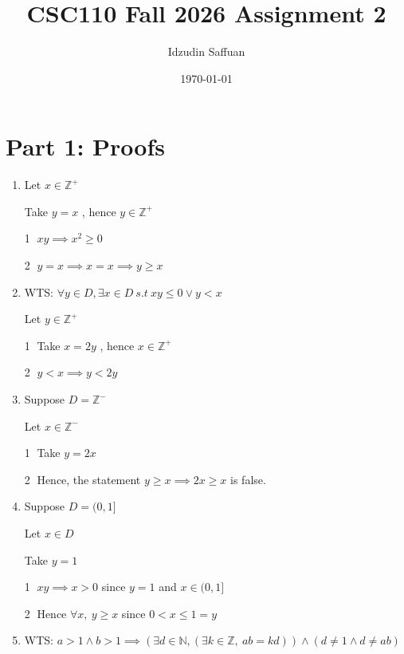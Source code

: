 \documentclass[12pt]{article}
\title{CSC110 Fall 2026 Assignment 2}
\author{Idzudin Saffuan}
\date{\today}
\begin{document}
\maketitle


\section*{Part 1: Proofs}

\begin{enumerate}
\item[1a.]
Let $x \in \mathbb{Z}^+ $

Take $y=x$ , hence $y \in \mathbb{Z}^+$

\textcircled{1} $xy \implies x^2 \geq 0$

\textcircled{2} $ y =x \implies x = x \implies y \geq x$



\item[1b.]
WTS: $\forall{y} \in D, \exists{x} \in D\ s.t \ xy \leq 0 \vee y < x $

Let $ y \in \mathbb{Z}^+$

\textcircled{1} Take $x = 2y$ , hence $ x \in \mathbb{Z}^+$

\textcircled{2} $ y < x \implies y < 2y$

\item[1c.]
Suppose $D = \mathbb{Z}^-$

Let $x \in \mathbb{Z}^-$

\textcircled{1} Take $y = 2x$

\textcircled{2} Hence, the statement $y \geq x \implies 2x \geq x$ is false.

\item[1d.]
Suppose $D = (0,1]$

Let $x \in D$

Take $y = 1$

\textcircled{1} $xy \implies x > 0 $ since $y=1$ and $x \in (0,1]$

\textcircled{2} Hence $\forall{x}, \ y \geq x$ since $0 < x \leq 1 = y$



\item[2.]
WTS: $a>1  \land  b>1 \implies (\exists{d}\in\mathbb{N},(\exists{k}\in\mathbb{Z},\ ab = kd))\land(d\neq1 \land d\neq ab)$


\end{enumerate}
\end{document}
